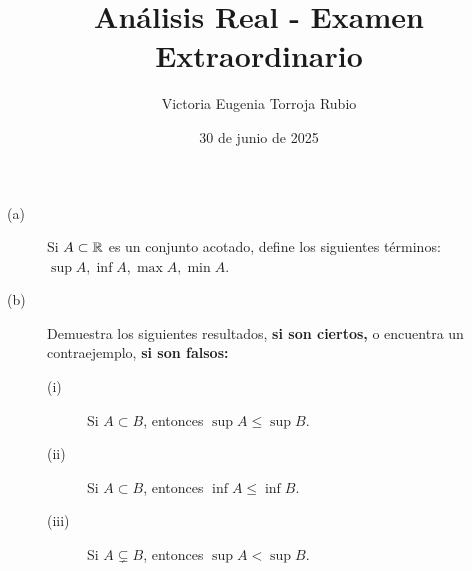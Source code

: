\documentclass{article}
\begin{document}
\title{Análisis Real - Examen Extraordinario}
\author{Victoria Eugenia Torroja Rubio}
\date{30 de junio de 2025}

\maketitle

\begin{ej}
\begin{description}
\item[(a)] Si $\displaystyle A \subset \mathbb{R} $ es un conjunto acotado, define los siguientes términos: $\displaystyle \sup A, \inf A, \max A, \min A $.
\item[(b)] Demuestra los siguientes resultados, \textbf{si son ciertos,} o encuentra un contraejemplo, \textbf{si son falsos:} 
	\begin{description}
	\item[(i)] Si $\displaystyle A \subset B $, entonces $\displaystyle \sup A \leq \sup B $.
	\item[(ii)] Si $\displaystyle A \subset B $, entonces $\displaystyle \inf A \leq \inf B $.
	\item[(iii)] Si $\displaystyle A \subsetneq B $, entonces $\displaystyle \sup A < \sup B$. 
	\end{description}
\end{description}
\end{ej}
\end{document}
